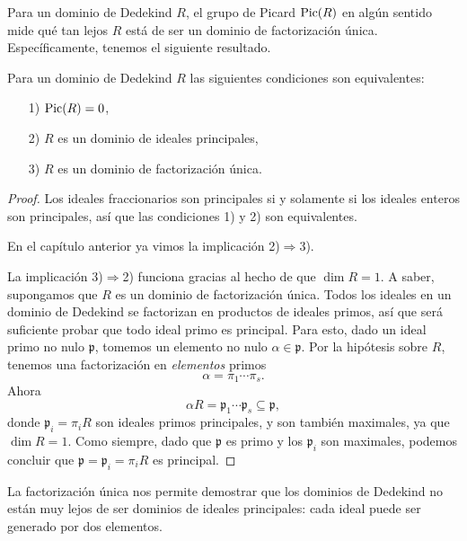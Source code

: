 Para un dominio de Dedekind $R$, el grupo de Picard $\operatorname{Pic} (R)$ en algún sentido
mide qué tan lejos $R$ está de ser un dominio de factorización única.
Específicamente, tenemos el siguiente resultado.

\begin{teorema}
  Para un dominio de Dedekind $R$ las siguientes condiciones son equivalentes:
  \begin{itemize}
  \item[1)] $\operatorname{Pic} (R) = 0$,
  \item[2)] $R$ es un dominio de ideales principales,
  \item[3)] $R$ es un dominio de factorización única.
  \end{itemize}

  \begin{proof}
    Los ideales fraccionarios son principales si y solamente si los ideales
    enteros son principales, así que las condiciones 1) y 2) son
    equivalentes.

    En el capítulo anterior ya vimos la implicación 2)$\Rightarrow$3).

    La implicación 3)$\Rightarrow$2) funciona gracias al hecho de que
    $\dim R = 1$. A saber, supongamos que $R$ es un dominio de factorización
    única. Todos los ideales en un dominio de Dedekind se factorizan en
    productos de ideales primos, así que será suficiente probar que todo ideal
    primo es principal. Para esto, dado un ideal primo no nulo $\mathfrak{p}$,
    tomemos un elemento no nulo $\alpha \in \mathfrak{p}$. Por la hipótesis
    sobre $R$, tenemos una factorización en \emph{elementos} primos
    $$\alpha = \pi_1 \cdots \pi_s.$$
    Ahora
    $$\alpha R = \mathfrak{p}_1\cdots\mathfrak{p}_s \subseteq \mathfrak{p},$$
    donde $\mathfrak{p}_i = \pi_i R$ son ideales primos principales, y son
    también maximales, ya que $\dim R = 1$.
    Como siempre, dado que $\mathfrak{p}$ es primo y los $\mathfrak{p}_i$ son
    maximales, podemos concluir que $\mathfrak{p} = \mathfrak{p}_i = \pi_i R$
    es principal.
  \end{proof}
\end{teorema}

La factorización única nos permite demostrar que los dominios de Dedekind no
están muy lejos de ser dominios de ideales principales: cada ideal puede ser
generado por dos elementos.

